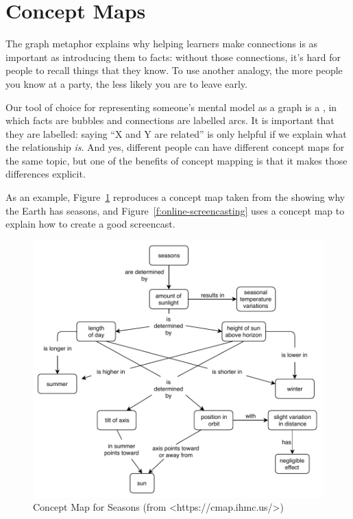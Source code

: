 \section{Concept Maps}\label{s:memory-concept-maps}

The graph metaphor explains why helping learners make connections is as
important as introducing them to facts: without those connections, it's
hard for people to recall things that they know. To use another analogy,
the more people you know at a party, the less likely you are to leave
early.

Our tool of choice for representing someone's mental model as a graph is
a , in which facts are bubbles
and connections are labelled arcs. It is important that they are
labelled: saying ``X and Y are related'' is only helpful if we explain
what the relationship \emph{is}. And yes, different people can have different
concept maps for the same topic, but one of the benefits of concept
mapping is that it makes those differences explicit.

As an example, Figure~\ref{f:memory-seasons} reproduces a concept map
taken from the  showing why the
Earth has seasons, and Figure~\ref{f:online-screencasting} uses a concept
map to explain how to create a good screencast.

\begin{figure}
\centering
\includegraphics{../../figures/seasons.pdf}
\caption{Concept Map for Seasons (from \textless{}https://cmap.ihmc.us/\textgreater{})}
\label{f:memory-seasons}
\end{figure}


